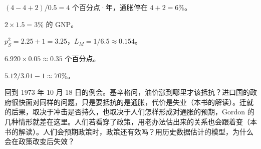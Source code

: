 \begin{answers}
\item $(4-4+2)/0.5=4$ 个百分点·年，通胀停在 $4+2=6\%$。
\item $2\times1.5=3\%$ 的 GNP。
\item $p_S^{2}=2.25+1=3.25$，$L_M=1/6.5\approx0.154$。
\item $6.920\times0.05\approx0.35$ 个百分点。
\item $5.12/3.01-1\approx70\%$。
\end{answers}

回到 1973 年 10 月 18 日的例会。基辛格问，油价涨到哪里才该抵抗？进口国的政府很快面对同样的问题，只是要抵抗的是通胀，代价是失业（本书的解读）。迁就的后果，取决于冲击是否持久，也取决于人们怎样形成对通胀的预期，Gordon 的几种情形就差在这里\cite{gordon1975}。人们若看穿了政策，用老办法估出来的关系也会跟着变（本书的解读）。人们会预期政策时，政策还有效吗？用历史数据估计的模型，为什么会在政策改变后失效？
